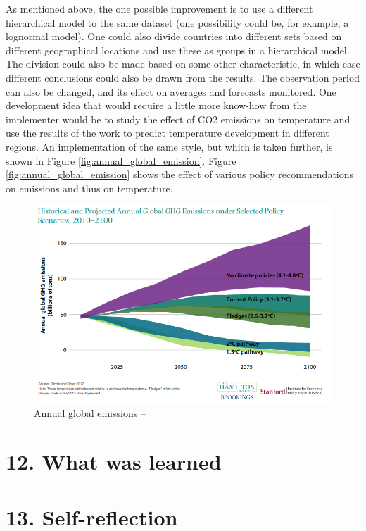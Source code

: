 \documentclass[
]{article}
\begin{document}
As mentioned above, the one possible improvement is to use a different
hierarchical model to the same dataset (one possibility could be, for
example, a lognormal model). One could also divide countries into
different sets based on different geographical locations and use these
as groups in a hierarchical model. The division could also be made based
on some other characteristic, in which case different conclusions could
also be drawn from the results. The observation period can also be
changed, and its effect on averages and forecasts monitored. One
development idea that would require a little more know-how from the
implementer would be to study the effect of CO2 emissions on temperature
and use the results of the work to predict temperature development in
different regions. An implementation of the same style, but which is
taken further, is shown in Figure \ref{fig:annual_global_emission}.
Figure \ref{fig:annual_global_emission} shows the effect of various
policy recommendations on emissions and thus on temperature.

\begin{figure}
\includegraphics[width=1\linewidth]{annual_global_emission} \caption{\label{fig:annual_global_emission}Annual global emissions -- }\label{fig:annual_global_emiss}
\end{figure}

\hypertarget{what-was-learned}{%
\section{12. What was learned}\label{what-was-learned}}

\hypertarget{self-reflection}{%
\section{13. Self-reflection}\label{self-reflection}}
\end{document}
